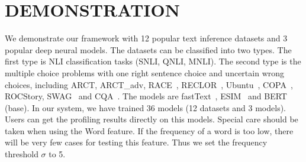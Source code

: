 \section{DEMONSTRATION}
\label{sec:demonstration}
We demonstrate our framework 
with 12 popular text inference datasets and 3 popular deep neural models.
The datasets can be 
classified into two types. 
The first type is NLI classification tasks (SNLI, QNLI, MNLI).
The second type is the multiple choice problems with one 
right sentence choice and uncertain wrong choices, 
including ARCT, 
ARCT\_adv\cite{schuster2019towards}, 
RACE~\cite{lai2017race}, RECLOR~\cite{yu2020reclor}, 
Ubuntu~\cite{lowe2015ubuntu}, COPA~\cite{roemmele2011choice}, ROCStory, SWAG~\cite{zellers2018swag} and 
CQA~\cite{talmor2019commonsenseqa}.
The models are fastText~\cite{joulin2017bag}, ESIM~\cite{chen2016enhanced} and BERT (base). 
In our system, we have trained 36 models (12 datasets and 3 models). Users can get the profiling 
results directly on this models. 
Special care should be taken when using the Word feature. 
If the frequency of a word is too low, there will be very few cases 
for testing this feature. 
Thus we set the frequency threshold $\sigma$ to 5. 


